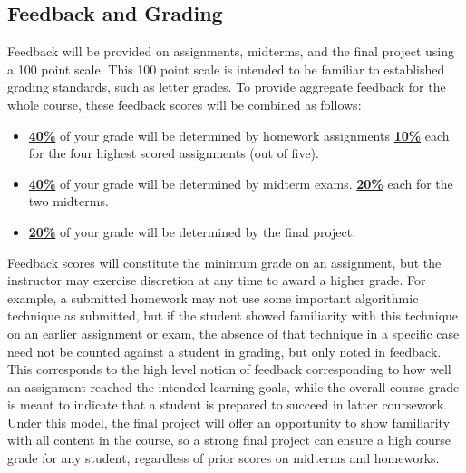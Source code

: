 \documentclass[11pt]{article}
\begin{document}
\subsection*{Feedback and Grading}
Feedback will be provided on assignments, midterms, and the final project using a 100 point scale.
This 100 point scale is intended to be familiar to established grading standards, such as letter grades. To provide aggregate feedback for the whole course, these feedback scores will be combined as follows:
\begin{itemize}
	\item \underline{\textbf{40\%}} of your grade will be determined by homework assignments
	\subitem \underline{\textbf{10\%}} each for the four highest scored assignments (out of five).
	\item \underline{\textbf{40\%}} of your grade will be determined by midterm exams.
	\subitem \underline{\textbf{20\%}} each for the two midterms.
	\item \underline{\textbf{20\%}} of your grade will be determined by the final project.
\end{itemize}

\noindent Feedback scores will constitute the minimum grade on an assignment, but the instructor
may exercise discretion at any time to award a higher grade. For example, a submitted homework
may not use some important algorithmic technique as submitted, but if the student showed familiarity
with this technique on an earlier assignment or exam, the absence of that technique in a specific
case need not be counted against a student in grading, but only noted in feedback. This corresponds to the high level notion of feedback corresponding to how well an assignment reached the intended learning goals, while the overall course grade is meant to indicate that a student is prepared to succeed in latter coursework. Under this model, the final project will offer an opportunity to show familiarity with all content in the course, so a strong final project can ensure a high course grade
for any student, regardless of prior scores on midterms and homeworks.




\end{document}
